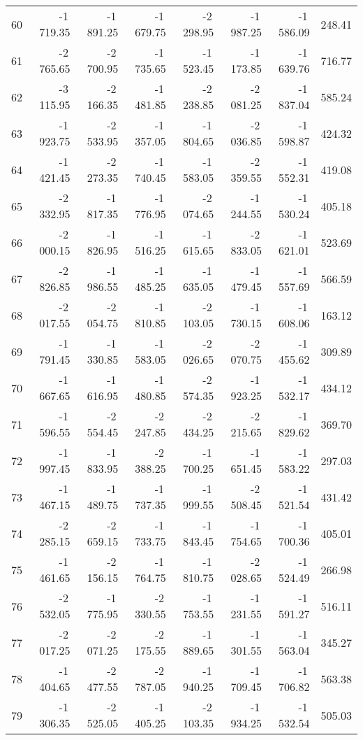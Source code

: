 \begin{longtable}{rrrrrrrr}
60 & -1\,719.35 & -1\,891.25 & -1\,679.75 & -2\,298.95 & -1\,987.25 & -1\,586.09 & 248.41  \\
61 & -2\,765.65 & -2\,700.95 & -1\,735.65 & -1\,523.45 & -1\,173.85 & -1\,639.76 & 716.77  \\
62 & -3\,115.95 & -2\,166.35 & -1\,481.85 & -2\,238.85 & -2\,081.25 & -1\,837.04 & 585.24  \\
63 & -1\,923.75 & -2\,533.95 & -1\,357.05 & -1\,804.65 & -2\,036.85 & -1\,598.87 & 424.32  \\
64 & -1\,421.45 & -2\,273.35 & -1\,740.45 & -1\,583.05 & -2\,359.55 & -1\,552.31 & 419.08  \\
65 & -2\,332.95 & -1\,817.35 & -1\,776.95 & -2\,074.65 & -1\,244.55 & -1\,530.24 & 405.18  \\
66 & -2\,000.15 & -1\,826.95 & -1\,516.25 & -1\,615.65 & -2\,833.05 & -1\,621.01 & 523.69  \\
67 & -2\,826.85 & -1\,986.55 & -1\,485.25 & -1\,635.05 & -1\,479.45 & -1\,557.69 & 566.59  \\
68 & -2\,017.55 & -2\,054.75 & -1\,810.85 & -2\,103.05 & -1\,730.15 & -1\,608.06 & 163.12  \\
69 & -1\,791.45 & -1\,330.85 & -1\,583.05 & -2\,026.65 & -2\,070.75 & -1\,455.62 & 309.89  \\
70 & -1\,667.65 & -1\,616.95 & -1\,480.85 & -2\,574.35 & -1\,923.25 & -1\,532.17 & 434.12  \\
71 & -1\,596.55 & -2\,554.45 & -2\,247.85 & -2\,434.25 & -2\,215.65 & -1\,829.62 & 369.70  \\
72 & -1\,997.45 & -1\,833.95 & -2\,388.25 & -1\,700.25 & -1\,651.45 & -1\,583.22 & 297.03  \\
73 & -1\,467.15 & -1\,489.75 & -1\,737.35 & -1\,999.55 & -2\,508.45 & -1\,521.54 & 431.42  \\
74 & -2\,285.15 & -2\,659.15 & -1\,733.75 & -1\,843.45 & -1\,754.65 & -1\,700.36 & 405.01  \\
75 & -1\,461.65 & -2\,156.15 & -1\,764.75 & -1\,810.75 & -2\,028.65 & -1\,524.49 & 266.98  \\
76 & -2\,532.05 & -1\,775.95 & -2\,330.55 & -1\,753.55 & -1\,231.55 & -1\,591.27 & 516.11  \\
77 & -2\,017.25 & -2\,071.25 & -2\,175.55 & -1\,889.65 & -1\,301.55 & -1\,563.04 & 345.27  \\
78 & -1\,404.65 & -2\,477.55 & -2\,787.05 & -1\,940.25 & -1\,709.45 & -1\,706.82 & 563.38  \\
79 & -1\,306.35 & -2\,525.05 & -1\,405.25 & -2\,103.35 & -1\,934.25 & -1\,532.54 & 505.03  \\

\end{longtable}
